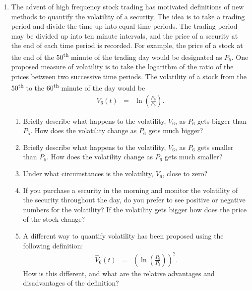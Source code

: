 \begin{enumerate}
  \clearpage

\item The advent of high frequency stock trading has motivated
  definitions of new methods to quantify the volatility of a
  security. The idea is to take a trading period and divide the time
  up into equal time periods. The trading period may be divided up
  into ten minute intervals, and the price of a security at the end of
  each time period is recorded. For example, the price of a stock at
  the end of the 50\textsuperscript{th} minute of the trading day
  would be designated as $P_5$. One proposed measure of volatility is
  to take the logarithm of the ratio of the prices between two
  successive time periods. The volatility of a stock from the
  50\textsuperscript{th} to the 60\textsuperscript{th} minute of the
  day would be 
  \begin{eqnarray*}
    V_6(t) & = & \ln\left(\frac{P_6}{P_5}\right).
  \end{eqnarray*}

  \begin{enumerate}
  \item Briefly describe what happens to the volatility, $V_6$, as
    $P_6$ gets bigger than $P_5$. How does the volatility change as
    $P_6$ gets much bigger?
    \vfill
  \item Briefly describe what happens to the volatility, $V_6$, as
    $P_6$ gets smaller than $P_5$. How does the volatility change as
    $P_6$ gets much smaller?
    \vfill
  \item Under what circumstances is the volatility, $V_6$, close to
    zero?
    \vfill
  \item If you purchase a security in the morning and monitor the
    volatility of the security throughout the day, do you prefer to
    see positive or negative numbers for the volatility? If the
    volatility gets bigger how does the price of the stock change?
    \vfill

  \item A different way to quantify volatility has been proposed using
    the following definition:
    \begin{eqnarray*}
      \hat{V}_6(t) & = & \left(\ln\left(\frac{P_6}{P_5}\right)\right)^2.
    \end{eqnarray*}
    How is this different, and what are the relative advantages and
    disadvantages of the definition?
    \vfill

  \end{enumerate}
  
\end{enumerate}

